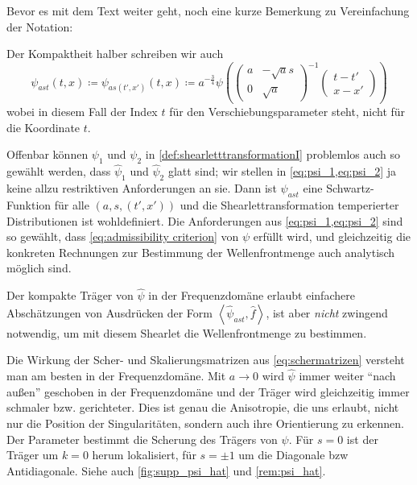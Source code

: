 Bevor es mit dem Text weiter geht, noch eine kurze Bemerkung zu Vereinfachung der Notation:

\begin{remark}[Notation]
    Der Kompaktheit halber schreiben wir auch
    \begin{equation*}
        \psi_{ast} (t,x) \coloneqq \psi_{as{(t',x')}} (t,x) \coloneqq
        a^{-\frac{3}{4}} \psi\left(
    \left(\begin{smallmatrix}
        a & -\sqrt a s \\ 0 & \sqrt a
    \end{smallmatrix}\right)^{-1}
    \left(\begin{smallmatrix}
        t-t' \\ x-x'
    \end{smallmatrix}\right)
    \right)
    \end{equation*}
    wobei in diesem Fall der Index $t$ für den Verschiebungsparameter steht, nicht für die Koordinate $t$.
\end{remark}

Offenbar können $\psi_1$ und $\psi_2$ in \cref{def:shearletttransformationI} problemlos auch so gewählt werden, dass $\hat\psi_1$ und $\hat\psi_2$ glatt sind; wir stellen in \cref{eq:psi_1,eq:psi_2} ja keine allzu restriktiven Anforderungen an sie. Dann ist $\psi_{ast}$ eine Schwartz-Funktion für alle $(a,s,(t',x'))$ und die Shearlettransformation temperierter Distributionen ist wohldefiniert.  Die Anforderungen aus \cref{eq:psi_1,eq:psi_2} sind so gewählt, dass \cref{eq:admissibility criterion} von $\psi$ erfüllt wird, und gleichzeitig die konkreten Rechnungen zur Bestimmung der Wellenfrontmenge auch analytisch möglich sind.

Der kompakte Träger von $\hat\psi$ in der Frequenzdomäne erlaubt einfachere
Abschätzungen von Ausdrücken der Form $\left<\hat \psi_{ast}, \hat f\right>$, ist aber \emph{nicht} zwingend notwendig, um mit diesem Shearlet die Wellenfrontmenge zu bestimmen.


Die Wirkung der Scher- und Skalierungsmatrizen aus \cref{eq:schermatrizen} versteht man am besten in der Frequenzdomäne. Mit $a \to 0$ wird $\hat \psi$ immer weiter "`nach außen"' geschoben in der Frequenzdomäne und der Träger wird gleichzeitig immer schmaler bzw. gerichteter. Dies ist genau die Anisotropie, die uns erlaubt, nicht nur die Position der Singularitäten, sondern auch ihre Orientierung zu erkennen. Der Parameter bestimmt die Scherung des Trägers von $\psi$. Für $s=0$ ist der Träger um $k=0$ herum lokalisiert, für $s = \pm 1$ um die Diagonale bzw Antidiagonale. Siehe auch \cref{fig:supp_psi_hat} und \cref{rem:psi_hat}.


